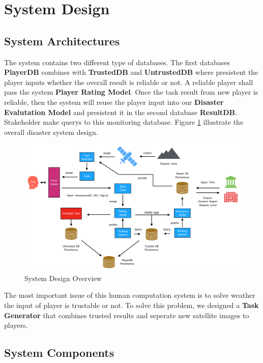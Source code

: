 \section{System Design}

\subsection{System Architectures}

  The system contains two different type of databases. The first databases \textbf{PlayerDB}
  combines with \textbf{TrustedDB} and \textbf{UntrustedDB} where
  presistent the player inputs whether the overall result is reliable or not. 
  A reliable player shall pass the system \textbf{Player Rating Model}. 
  Once the task result from new player is reliable, then the system will
  reuse the player input into our \textbf{Disaster Evalutation Model} and presistent it in the second
  database \textbf{ResultDB}. Stakeholder make querys to this monitoring database. 
  Figure \ref{fig:arch} illustrate the overall disaster system design.

    \begin{figure}[htp]
    \centering
    \includegraphics[width=\textwidth]{figures/system2}
    \caption{System Design Overview}
    \label{fig:arch}
    \end{figure}

  The most important issue of this human computation system is to solve weather the input of player 
  is trustable or not. To solve this problem, we designed a \textbf{Task Generator} that combines 
  trusted results and seperate new satellite images to players. 

\subsection{System Components}

